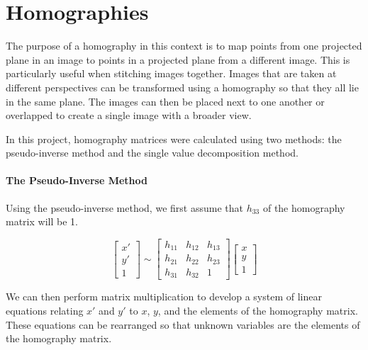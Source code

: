 \documentclass[11pt, letterpaper]{article}
\begin{document}
\section{Homographies}
The purpose of a homography in this context is to map points from one
projected plane in an image to points in a projected plane from a
different image. This is particularly useful when stitching images
together. Images that are taken at different perspectives can be
transformed using a homography so that they all lie in the same
plane. The images can then be placed next to one another or overlapped
to create a single image with a broader view. 

In this project, homography matrices were calculated using two methods:
the pseudo-inverse method and the single value decomposition method.

\paragraph{The Pseudo-Inverse Method}
Using the pseudo-inverse method, we first assume that $h_{33}$ of the
homography matrix will be 1. 

\[
\begin{bmatrix}
  x' \\  y' \\  1
\end{bmatrix}
\sim 
\begin{bmatrix}
  h_{11} & h_{12} & h_{13} \\
  h_{21} & h_{22} & h_{23} \\
  h_{31} & h_{32} & 1 
\end{bmatrix}
\begin{bmatrix}
  x \\  y \\  1
\end{bmatrix}
\]

We can then perform matrix multiplication to develop a system of
linear equations relating $x'$ and $y'$ to $x$, $y$, and the elements
of the homography matrix. These equations can be rearranged so that
unknown variables are the elements of the homography matrix.
\end{document}
